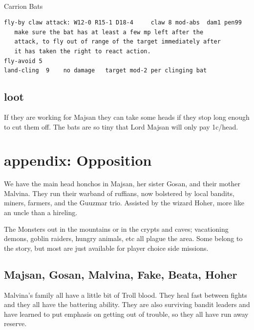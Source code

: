 \

Carrion Bats
\small \begin{verbatim}
fly-by claw attack: W12-0 R15-1 D18-4     claw 8 mod-abs  dam1 pen99
   make sure the bat has at least a few mp left after the
   attack, to fly out of range of the target immediately after
   it has taken the right to react action.
fly-avoid 5
land-cling  9    no damage   target mod-2 per clinging bat

\end{verbatim} \normalsize



\subsection*{loot}
If they are working for Majsan they can take some heads if they stop long enough to cut them off. The bats are so tiny that Lord Majsan will only pay 1c/head.











\section*{appendix: Opposition}
We have the main head honchos in Majsan, her sister Gosan, and their mother Malvina. They run their warband of ruffians, now bolstered by local bandits, miners, farmers, and the Guuzmar trio. Assisted by the wizard Hoher, more like an uncle than a hireling.

The Monsters out in the mountains or in the crypts and caves; vacationing demons, goblin raiders, hungry animals, etc all plague the area. Some belong to the story, but most are just available for player choice side missions.





\subsection*{Majsan, Gosan, Malvina, Fake, Beata, Hoher}
Malvina's family all have a little bit of Troll blood. They heal fast between fights and they all have the battering ability. They are also surviving bandit leaders and have learned to put emphasis on getting out of trouble, so they all have run away reserve.



